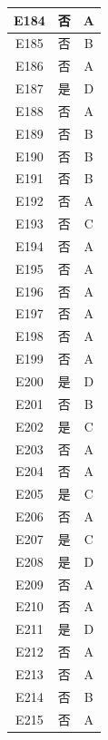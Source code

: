 \documentclass[UTF8]{ctexart}
\begin{document}
\begin{center}
\begin{longtable}{|c|c|c|}
		E184     & 否       & A        \\ \hline
		E185     & 否       & B        \\ \hline
		E186     & 否       & A        \\ \hline
		E187     & 是       & D        \\ \hline
		E188     & 否       & A        \\ \hline
		E189     & 否       & B        \\ \hline
		E190     & 否       & B        \\ \hline
		E191     & 否       & B        \\ \hline
		E192     & 否       & A        \\ \hline
		E193     & 否       & C        \\ \hline
		E194     & 否       & A        \\ \hline
		E195     & 否       & A        \\ \hline
		E196     & 否       & A        \\ \hline
		E197     & 否       & A        \\ \hline
		E198     & 否       & A        \\ \hline
		E199     & 否       & A        \\ \hline
		E200     & 是       & D        \\ \hline
		E201     & 否       & B        \\ \hline
		E202     & 是       & C        \\ \hline
		E203     & 否       & A        \\ \hline
		E204     & 否       & A        \\ \hline
		E205     & 是       & C        \\ \hline
		E206     & 否       & A        \\ \hline
		E207     & 是       & C        \\ \hline
		E208     & 是       & D        \\ \hline
		E209     & 否       & A        \\ \hline
		E210     & 否       & A        \\ \hline
		E211     & 是       & D        \\ \hline
		E212     & 否       & A        \\ \hline
		E213     & 否       & A        \\ \hline
		E214     & 否       & B        \\ \hline
		E215     & 否       & A        \\ \hline

\end{longtable}
\end{center}
\end{document}
